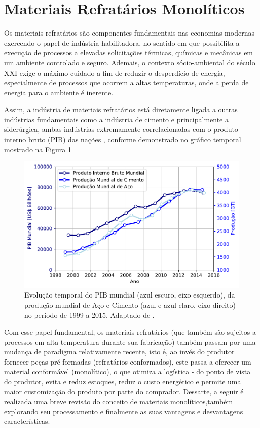 \section{Materiais Refratários Monolíticos}\label{mono}

	Os materiais refratários são componentes fundamentais nas economias modernas
  exercendo o papel de indústria habilitadora, no sentido em que possibilita a execução de processos a elevadas solicitações térmicas, químicas e mecânicas em um ambiente controlado e seguro. Ademais, o contexto sócio-ambiental do século XXI exige o máximo cuidado a fim de reduzir o desperdício de energia, especialmente de processos que ocorrem a altas temperaturas, onde a perda de energia para o ambiente é inerente.

	Assim, a indústria de materiais refratários está diretamente ligada a outras
  indústrias fundamentais como a indústria de cimento e principalmente a
  siderúrgica, ambas indústrias extremamente correlacionadas com o produto
  interno bruto (PIB) das nações\cite{Ravazzolo2017, Bordigoni2016, Dobrota2013} , conforme demonstrado no gráfico temporal mostrado na Figura \ref{fig:refractory_economy}

\begin{figure}[ht]
\centering
\includegraphics[width=\linewidth]{./figures/refractory_economy.pdf}
\caption{Evolução temporal do PIB mundial (azul escuro, eixo esquerdo), da produção mundial de Aço e Cimento (azul e azul claro, eixo direito) no período de 1999 a 2015.  Adaptado de \cite{GlobalRef2017}. \label{fig:refractory_economy}}
\end{figure}
		Com esse papel fundamental, os materiais refratários (que também são
    sujeitos a processos em alta temperatura durante sua fabricação) também passam por uma mudança de paradigma relativamente recente, isto é, ao invés do produtor fornecer peças pré-formadas (refratários conformados), este passa a oferecer um material conformável (monolítico), o que otimiza a logística - do ponto de vista do produtor, evita e reduz estoques, reduz o custo energético e permite uma maior customização do produto por parte do comprador.
    Dessarte, a seguir é realizada uma breve revisão do conceito de materiais monolíticos,também explorando seu processamento e finalmente as suas vantagens e desvantagens características.

